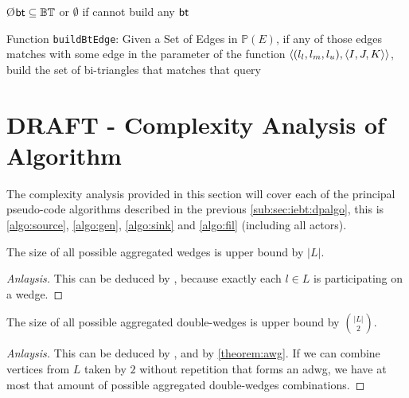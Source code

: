 \begin{algorithm}[h!]
\SetAlgoRefName{[A10]}
\O{$\mathsf{bt} \subseteq \mathbb{BT}$ or $\emptyset$ if cannot build any $\mathsf{bt}$}
\caption[Function \texttt{buildBtEdge}]{Function \texttt{buildBtEdge}: Given a Set of Edges in $\mathbb{P}(E)$, if any of those edges matches with some edge in the parameter of the function $\left\langle (l_l, l_m, l_u), \left\langle I,J,K \right\rangle \right\rangle$, build the set of bi-triangles that matches that query}
\label{algo:buildBtEdge}
\end{algorithm}

\clearpage
\section{DRAFT - Complexity Analysis of Algorithm}
The complexity analysis provided in this section will cover each of the principal pseudo-code algorithms described in the previous \autoref{sub:sec:iebt:dpalgo}, this is \autoref{algo:source}, \autoref{algo:gen}, \autoref{algo:sink} and \autoref{algo:fil} (including all actors). 

\begin{theorem}[$|\aw| \leq |L|$]\label{theorem:awg}
The size of all possible aggregated wedges is upper bound by $|L|$.
\end{theorem}
\begin{proof}[Anlaysis]
This can be deduced by , because exactly each $l \in L$ is participating on a wedge.
\end{proof}

\begin{theorem}\label{theorem:adwg}
The size of all possible aggregated double-wedges is upper bound by $\binom{|L|}{2}$.
\end{theorem}
\begin{proof}[Anlaysis]
This can be deduced by , and by \autoref{theorem:awg}. If we can combine vertices from $L$ taken by $2$ without repetition that forms an \acrshort{adwg}, we have at most that amount of possible aggregated double-wedges combinations.
\end{proof}
      
